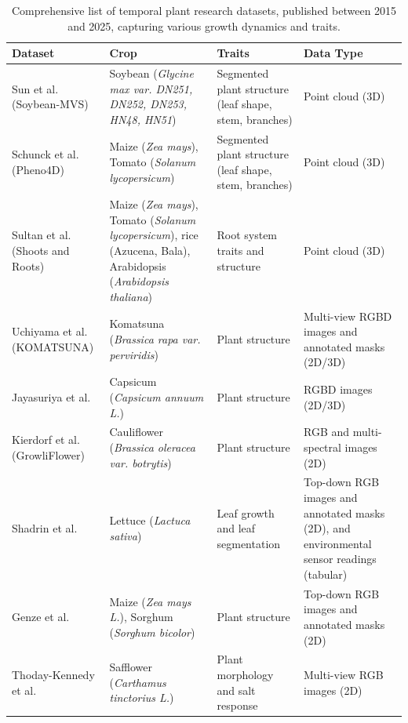 \documentclass{article}
\begin{document}
\begin{table}
\caption{Comprehensive list of temporal plant research datasets, published between 2015 and 2025, capturing various growth dynamics and traits. \label{dataset list}}
\scriptsize %
\begin{tabularx}{\textwidth}{@{\extracolsep{\fill}}p{}p{}X X@{\extracolsep{\fill}}}
\toprule
\textbf{Dataset} & \textbf{Crop} & \textbf{Traits} & \textbf{Data Type} \\
\midrule
Sun et al. (Soybean-MVS) \cite{Sun2023soybeanmvs} & Soybean (\textit{Glycine max var. DN251, DN252, DN253, HN48, HN51}) & Segmented plant structure (leaf shape, stem, branches) & Point cloud (3D) \\
\hline
Schunck et al. (Pheno4D) \cite{10.1371/journal.pone.0256340} & Maize (\textit{Zea mays}), Tomato (\textit{Solanum lycopersicum}) & Segmented plant structure (leaf shape, stem, branches) & Point cloud (3D) \\
\hline
Sultan et al. (Shoots and Roots) \cite{doi:10.34133/2020/2073723} & Maize (\textit{Zea mays}), Tomato (\textit{Solanum lycopersicum}), rice (Azucena, Bala), Arabidopsis (\textit{Arabidopsis thaliana}) & Root system traits and structure & Point cloud (3D) \\
\hline
Uchiyama et al. (KOMATSUNA) \cite{Uchiyama2017Komatsuna} & Komatsuna (\textit{Brassica rapa var. perviridis}) & Plant structure & Multi-view RGBD images and annotated masks (2D/3D) \\
\hline
Jayasuriya et al. \cite{JAYASURIYA2024110735} & Capsicum (\textit{Capsicum annuum L.}) & Plant structure & RGBD images (2D/3D) \\
\hline
Kierdorf et al. (GrowliFlower) \cite{Uchiyama2017Komatsuna} & Cauliflower (\textit{Brassica oleracea var. botrytis}) & Plant structure & RGB and multi-spectral images (2D) \\
\hline
Shadrin et al. \cite{Shadrin2018InstanceSF} & Lettuce (\textit{Lactuca sativa}) & Leaf growth and leaf segmentation & Top-down RGB images and annotated masks (2D), and environmental sensor readings (tabular) \\
\hline
Genze et al. \cite{genze2024manually} & Maize (\textit{Zea mays L.}), Sorghum (\textit{Sorghum bicolor}) & Plant structure & Top-down RGB images and annotated masks (2D) \\
\hline
Thoday-Kennedy et al. \cite{THODAYKENNEDY2023108787} & Safflower (\textit{Carthamus tinctorius L.}) & Plant morphology and salt response & Multi-view RGB images (2D) \\

\end{tabularx}
\end{table}
\end{document}
